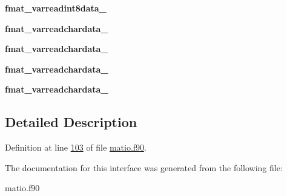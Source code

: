 \begin{DoxyCompactItemize}
{\bfseries fmat\+\_\+varreadint8data\+\_}
\item 
\mbox{\label{interfacematio_1_1fmat__varreaddata_adeb17e9aeb3ea4fa691ce525fa79e4cf}} 
{\bfseries fmat\+\_\+varreadchardata\+\_}
\item 
\mbox{\label{interfacematio_1_1fmat__varreaddata_af8a7638130c9e91a3bbddb74edba655b}} 
{\bfseries fmat\+\_\+varreadchardata\+\_}
\item 
\mbox{\label{interfacematio_1_1fmat__varreaddata_a08660d07deda9e0eff05031bb948ae4d}} 
{\bfseries fmat\+\_\+varreadchardata\+\_}
\item 
\mbox{\label{interfacematio_1_1fmat__varreaddata_a10f2f11343fba506480855b5efc2945c}} 
{\bfseries fmat\+\_\+varreadchardata\+\_}
\end{DoxyCompactItemize}


\subsection{Detailed Description}


Definition at line \hyperlink{matio_8f90_source_l00103}{103} of file \hyperlink{matio_8f90_source}{matio.\+f90}.



The documentation for this interface was generated from the following file\+:\begin{DoxyCompactItemize}
\item 
matio.\+f90\end{DoxyCompactItemize}
